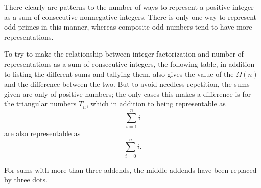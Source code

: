 \documentclass[12pt]{article}
\begin{document}
There clearly are patterns to the number of ways to represent a positive integer as a sum of consecutive nonnegative integers. There is only one way to represent odd primes in this manner, whereas composite odd numbers tend to have more representations.

To try to make the relationship between integer factorization and number of representations as a sum of consecutive integers, the following table, in addition to listing the different sums and tallying them, also gives the value of the  $\Omega(n)$ and the difference between the two. But to avoid needless repetition, the sums given are only of positive numbers; the only cases this makes a difference is for the triangular numbers $T_n$, which in addition to being representable as $$\sum_{i = 1}^n i$$ are also representable as $$\sum_{i = 0}^n i.$$

For sums with more than three addends, the middle addends have been replaced by three dots.
\end{document}
